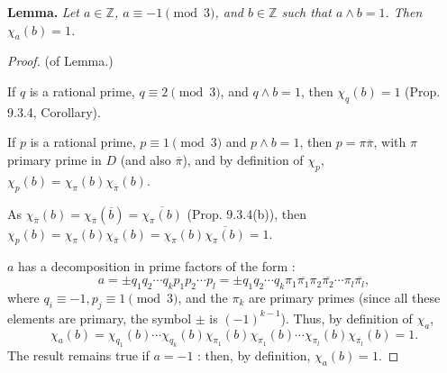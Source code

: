 \documentclass[11pt,a4paper]{article}
\newcommand{\Z}{\mathbb{Z}}
\begin{document}
\bigskip

{\bf Lemma.} {\it Let $a \in \Z$, $a \equiv -1 \pmod 3$, and $b\in \Z$ such that $a \wedge b = 1$. Then $\chi_a(b)= 1$.}

\bigskip

\begin{proof}(of Lemma.)

If $q$ is a rational prime, $q \equiv 2 \pmod 3$, and $q \wedge b = 1$, then $\chi_q(b) = 1$ (Prop. 9.3.4, Corollary).

If $p$ is a rational prime, $p \equiv 1 \pmod 3$ and $p \wedge b = 1$, then $p = \pi \overline{\pi}$, with $\pi$ primary prime in $D$ (and also $\overline{\pi}$), and by definition of $\chi_p$, $\chi_p(b) = \chi_\pi(b) \chi_{\overline{\pi}}(b)$.

As $\chi_{\overline{\pi}}(b) = \chi_{\overline{\pi}}(\overline{b}) = \overline{\chi_\pi(b)}$ (Prop. 9.3.4(b)), then $\chi_p(b)  = \chi_\pi(b) \chi_{\overline{\pi}}(b) = \chi_\pi(b)\overline{\chi_\pi(b)}= 1$.

$a$ has a decomposition in prime  factors of the form :
$$a = \pm q_1q_2\cdots q_k p_1p_2\cdots p_l = \pm q_1q_2\cdots q_k \pi_1 \overline{\pi_1} \pi_2 \overline{\pi_2}\cdots \pi_l \overline{\pi_l},$$
where $q_i \equiv -1 , p_j \equiv 1 \pmod 3$, and  the $\pi_k$ are primary primes (since all these elements are primary, the symbol $\pm$ is $(-1)^{k-1}$).
Thus, by definition of $\chi_a$,
$$\chi_a(b) = \chi_{q_1}(b)\cdots \chi_{q_k}(b) \chi_{\pi_1}(b)\chi_{\overline{\pi_1}}(b)\cdots \chi_{\pi_l}(b)\chi_{\overline{\pi_l}}(b) = 1.$$
The result remains true if $a = -1$ : then, by definition, $\chi_a(b) = 1$.

\end{proof}

\bigskip
\end{document}
